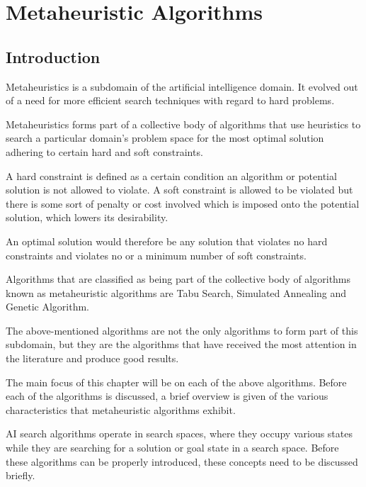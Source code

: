 \chapter{Metaheuristic Algorithms}
\label{chpt:heuristic}
\section{Introduction}
Metaheuristics is a subdomain of the artificial intelligence domain\cite{AIModernApproach}. It evolved out of a need for more efficient search techniques with regard to hard problems. 

Metaheuristics forms part of a collective body of algorithms that use heuristics to search a particular domain's problem space for the most optimal solution adhering to certain hard and soft constraints\cite{AIModernApproach,NatureInspiredMetaHeuristic}. 

A hard constraint is defined as a certain condition an algorithm or potential solution is not allowed to violate\cite{AIModernApproach,NatureInspiredMetaHeuristic,Karen2004,Eisenblatter}. A soft constraint is allowed to be violated but there is some sort of penalty or cost involved which is imposed onto the potential solution, which lowers its desirability\cite{AIModernApproach,NatureInspiredMetaHeuristic,Karen2004,Eisenblatter}. 

An optimal solution would therefore be any solution that violates no hard constraints and violates no or a minimum number of soft constraints\cite{AIModernApproach,NatureInspiredMetaHeuristic,Karen2004,Eisenblatter}.

Algorithms that are classified as being part of the collective body of algorithms known as metaheuristic algorithms are Tabu Search\cite{TabuVechicleRoutingWithTimeWindows,TabuCSP}, Simulated Annealing \cite{SASingleMultiObj,CurveFittingSA} and Genetic Algorithm\cite{GATSP, GeostatisticalGA}.

The above-mentioned algorithms are not the only algorithms to form part of this subdomain, but they are the algorithms that have received the most attention in the literature and produce good results\cite{SweepMeta}.

The main focus of this chapter will be on each of the above algorithms. Before each of the algorithms is discussed, a brief overview is given of the various characteristics that metaheuristic algorithms exhibit. 

AI search algorithms operate in search spaces, where they occupy various states while they are searching for a solution or goal state in a search space. Before these algorithms can be properly introduced, these concepts need to be discussed briefly.

